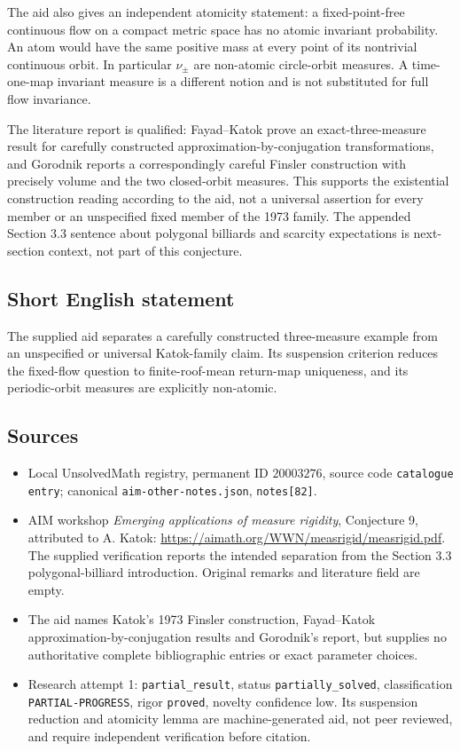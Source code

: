 \documentclass[11pt]{article}
\begin{document}
The aid also gives an independent atomicity statement: a fixed-point-free continuous flow on a compact metric space has no atomic invariant probability. An atom would have the same positive mass at every point of its nontrivial continuous orbit. In particular $\nu_\pm$ are non-atomic circle-orbit measures. A time-one-map invariant measure is a different notion and is not substituted for full flow invariance.

The literature report is qualified: Fayad--Katok prove an exact-three-measure result for carefully constructed approximation-by-conjugation transformations, and Gorodnik reports a correspondingly careful Finsler construction with precisely volume and the two closed-orbit measures. This supports the existential construction reading according to the aid, not a universal assertion for every member or an unspecified fixed member of the 1973 family. The appended Section 3.3 sentence about polygonal billiards and scarcity expectations is next-section context, not part of this conjecture.
\subsection{Short English statement}
The supplied aid separates a carefully constructed three-measure example from an unspecified or universal Katok-family claim. Its suspension criterion reduces the fixed-flow question to finite-roof-mean return-map uniqueness, and its periodic-orbit measures are explicitly non-atomic.
\subsection{Sources}
\begin{itemize}
\item Local UnsolvedMath registry, permanent ID $20003276$, source code \texttt{catalogue entry}; canonical \texttt{aim-other-notes.json}, \texttt{notes[82]}.
\item AIM workshop \emph{Emerging applications of measure rigidity}, Conjecture 9, attributed to A. Katok: \url{https://aimath.org/WWN/measrigid/measrigid.pdf}. The supplied verification reports the intended separation from the Section 3.3 polygonal-billiard introduction. Original remarks and literature field are empty.
\item The aid names Katok's 1973 Finsler construction, Fayad--Katok approximation-by-conjugation results and Gorodnik's report, but supplies no authoritative complete bibliographic entries or exact parameter choices.
\item Research attempt 1: \texttt{partial\_result}, status \texttt{partially\_solved}, classification \texttt{PARTIAL-PROGRESS}, rigor \texttt{proved}, novelty confidence low. Its suspension reduction and atomicity lemma are machine-generated aid, not peer reviewed, and require independent verification before citation.
\end{itemize}
\end{document}

